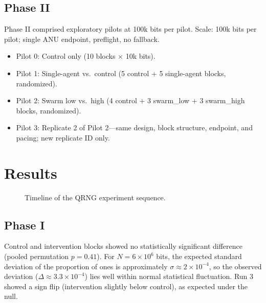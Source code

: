 \documentclass[reprint,amsmath,amssymb,aps,showkeys]{revtex4-2}
\begin{document}
\subsection{Phase II}
Phase II comprised exploratory pilots at 100k bits per pilot. Scale: 100k bits per pilot; single ANU endpoint, preflight, no fallback.
\begin{itemize}[noitemsep]
\item Pilot 0: Control only (10 blocks $\times$ 10k bits).
\item Pilot 1: Single-agent vs.\ control (5 control + 5 single-agent blocks, randomized).
\item Pilot 2: Swarm low vs.\ high (4 control + 3 swarm\_low + 3 swarm\_high blocks, randomized).
\item Pilot 3: Replicate 2 of Pilot 2---same design, block structure, endpoint, and pacing; new replicate ID only.
\end{itemize}

\section{Results}

\begin{figure}[h]
\centering
{}
\caption{Timeline of the QRNG experiment sequence.}
\end{figure}

\subsection{Phase I}
Control and intervention blocks showed no statistically significant difference (pooled permutation $p = 0.41$). For $N = 6\times10^6$ bits, the expected standard deviation of the proportion of ones is approximately $\sigma \approx 2\times10^{-4}$, so the observed deviation ($\Delta \approx 3.3\times10^{-4}$) lies well within normal statistical fluctuation. Run 3 showed a sign flip (intervention slightly below control), as expected under the null.
\end{document}
